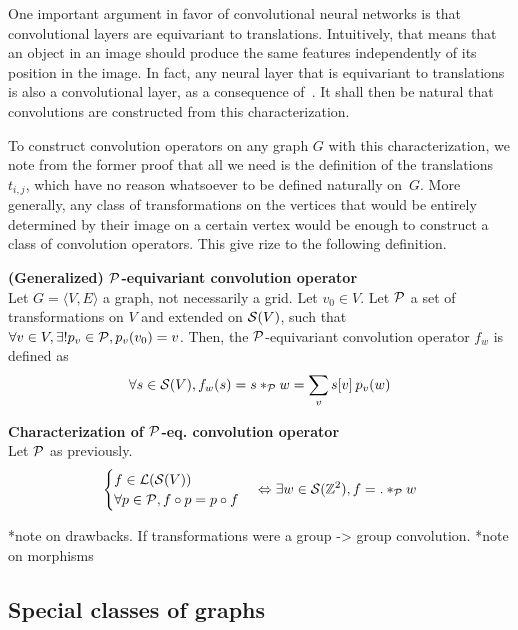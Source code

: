One important argument in favor of convolutional neural networks is that convolutional layers are equivariant to translations. Intuitively, that means that an object in an image should produce the same features independently of its position in the image. In fact, any neural layer that is equivariant to translations is also a convolutional layer, as a consequence of~. It shall then be natural that convolutions are constructed from this characterization.

To construct convolution operators on any graph $G$ with this characterization, we note from the former proof that all we need is the definition of the translations $t_{i,j}$, which have no reason whatsoever to be defined naturally on~$G$. More generally, any class of transformations on the vertices that would be entirely determined by their image on a certain vertex would be enough to construct a class of convolution operators. This give rize to the following definition.

\begin{definition}\textbf{(Generalized) $\cp$-equivariant convolution operator}\\
Let $G = \langle V,E \rangle$ a graph, not necessarily a grid. Let $v_0 \in V$. Let $\cp$ a set of transformations on $V$ and extended on $\cs(V)$, such that $\forall v \in V, \exists! p_v \in \cp, p_v(v_0) = v$. Then, the  $\cp$-equivariant convolution operator $f_w$ is defined as
\begin{gather*}
\forall s \in \cs(V), f_w(s) = s \ast_{\cp} w = \displaystyle \sum_v s[v] \h{2} p_v(w)
\end{gather*}
\end{definition}

\begin{proposition}\textbf{Characterization of $\cp$-eq. convolution operator}\\
Let $\cp$ as previously.
\begin{gather*}
\begin{cases}
 f \in \cl(\cs(V))\\
 \forall p \in \cp, f \circ p = p \circ f
\end{cases}
 \Leftrightarrow \exists w \in \cs(\bbz^2), f = . \ast_{\cp} w
\end{gather*}
\label{prop:equi}
\end{proposition}

*note on drawbacks. If transformations were a group -> group convolution.
*note on morphisms

\subsection{Special classes of graphs}

